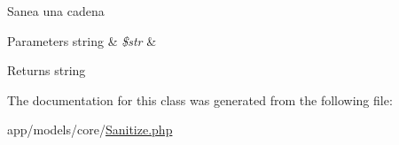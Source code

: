 Sanea una cadena 
\begin{DoxyParams}[1]{Parameters}
string & {\em \$str} & \\
\hline
\end{DoxyParams}
\begin{DoxyReturn}{Returns}
string 
\end{DoxyReturn}


The documentation for this class was generated from the following file\-:\begin{DoxyCompactItemize}
\item 
app/models/core/\hyperlink{_sanitize_8php}{Sanitize.\-php}\end{DoxyCompactItemize}
